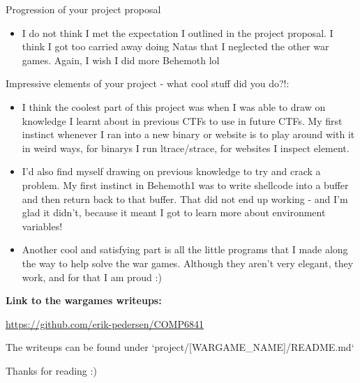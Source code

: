 \documentclass{article}
\begin{document}
Progression of your project proposal

\begin{itemize}
	\item I do not think I met the expectation I outlined in the project proposal. I think I got too carried away doing Natas that I neglected the other war games. Again, I wish I did more Behemoth lol
\end{itemize}

Impressive elements of your project - what cool stuff did you do?!:

\begin{itemize}
	\item I think the coolest part of this project was when I was able to draw on knowledge I learnt about in previous CTFs to use in future CTFs. My first instinct whenever I ran into a new binary or website is to play around with it in weird ways, for binarys I run ltrace/strace, for websites I inspect element. 
	\item I'd also find myself drawing on previous knowledge to try and crack a problem. My first instinct in Behemoth1 was to write shellcode into a buffer and then return back to that buffer. That did not end up working - and I'm glad it didn't, because it meant I got to learn more about environment variables!
	\item Another cool and satisfying part is all the little programs that I made along the way to help solve the war games. Although they aren't very elegant, they work, and for that I am proud :)
\end{itemize}

\textbf{Link to the wargames writeups:}

\url{https://github.com/erik-pedersen/COMP6841}

The writeups can be found under `project/[WARGAME\_NAME]/README.md`


Thanks for reading :)
\end{document}
